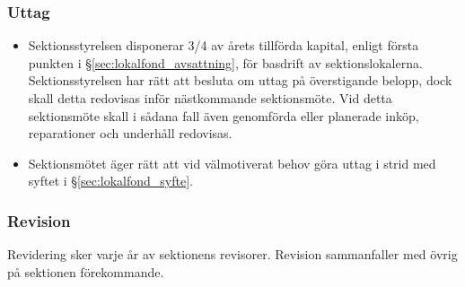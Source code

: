 \documentclass[a4paper, 10pt]{article}
\begin{document}
\subsubsection{Uttag}
\begin{itemize}
\item Sektionsstyrelsen disponerar 3/4 av årets tillförda kapital,
enligt första punkten i §\ref{sec:lokalfond_avsattning}, för basdrift av sektionslokalerna. Sektionsstyrelsen har rätt att besluta om uttag på överstigande belopp, dock skall detta redovisas inför nästkommande sektionsmöte. Vid detta sektionsmöte skall i sådana fall även genomförda eller planerade inköp, reparationer och underhåll redovisas.
\item Sektionsmötet äger rätt att vid välmotiverat behov göra uttag i strid med syftet i §\ref{sec:lokalfond_syfte}.
\end{itemize}
\subsubsection{Revision}
Revidering sker varje år av sektionens revisorer. Revision
sammanfaller med övrig på sektionen förekommande.
\end{document}
